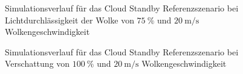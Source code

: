 \begin{figure}[h!]
    \centering
    \setlength{\fboxsep}{1pt}
    \setlength{\fboxrule}{1pt}
    \caption[Simulationsverlauf für das Cloud Standby Referenzszenario bei Lichtdurchlässigkeit der Wolke von $\SI{75}{\percent}$ und $\SI{20}{\metre\per\second}$ Wolkengeschwindigkeit]{Simulationsverlauf für das Cloud Standby Referenzszenario bei Lichtdurchlässigkeit der Wolke von $\SI{75}{\percent}$ und $\SI{20}{\metre\per\second}$ Wolkengeschwindigkeit}
    \label{fig_cloudstandby7520}
\end{figure}

\begin{figure}[h!]
    \centering
    \setlength{\fboxsep}{1pt}
    \setlength{\fboxrule}{1pt}
    \caption[Simulationsverlauf für das Cloud Standby Referenzszenario bei Verschattung von $\SI{100}{\percent}$ und $\SI{20}{\metre\per\second}$ Wolkengeschwindigkeit]{Simulationsverlauf für das Cloud Standby Referenzszenario bei Verschattung von $\SI{100}{\percent}$ und $\SI{20}{\metre\per\second}$ Wolkengeschwindigkeit}
    \label{fig_cloudstandby0020}
\end{figure}

